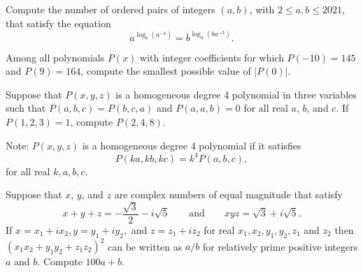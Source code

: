 \begin{question}[name={2021 HMMT, Algebra \& Number Theory, \href{https://artofproblemsolving.com/community/c4p22157455}{Problem 2}}]
	Compute the number of ordered pairs of integers $(a, b)$, with $2 \le a, b \le 2021,$ that satisfy the equation
	\[a^{\log_b \left(a^{-4}\right)} = b^{\log_a \left(ba^{-3}\right)}.\]
\end{question}


%	




\begin{question}[name={2021 HMMT, Algebra \& Number Theory, \href{https://artofproblemsolving.com/community/c4p22157460}{Problem 3}}]
	Among all polynomials $P(x)$ with integer coefficients for which $P(-10) = 145$ and $P(9) = 164$, compute the smallest possible value of $|P(0)|$.
\end{question}


%	



\begin{question}[name={2021 HMMT, Algebra \& Number Theory, \href{https://artofproblemsolving.com/community/c4p22157468}{Problem 4}}]
	Suppose that $P(x, y, z)$ is a homogeneous degree 4 polynomial in three variables such that $P(a, b, c) = P(b, c, a)$ and $P(a, a, b) = 0$ for all real $a$, $b$, and $c$. If $P(1, 2, 3) = 1$, compute $P(2, 4, 8)$.
	
	Note: $P(x, y, z)$ is a homogeneous degree $4$ polynomial if it satisfies $$P(ka, kb, kc) = k^4P(a, b, c),$$ for all real $k, a, b, c$.
\end{question}


%	



\begin{question}[name={2021 HMMT, Algebra \& Number Theory, \href{https://artofproblemsolving.com/community/c4p22157488}{Problem 7}}]
	Suppose that $x$, $y$, and $z$ are complex numbers of equal magnitude that satisfy
	\[x+y+z = -\frac{\sqrt{3}}{2}-i\sqrt{5} \qquad \text{and} \qquad xyz=\sqrt{3} + i\sqrt{5}.\]If $x=x_1+ix_2, y=y_1+iy_2,$ and $z=z_1+iz_2$ for real $x_1,x_2,y_1,y_2,z_1$ and $z_2$ then
	$(x_1x_2+y_1y_2+z_1z_2)^2$ can be written as ${a}/{b}$ for relatively prime positive integers $a$ and $b$. Compute $100a+b.$
\end{question}


